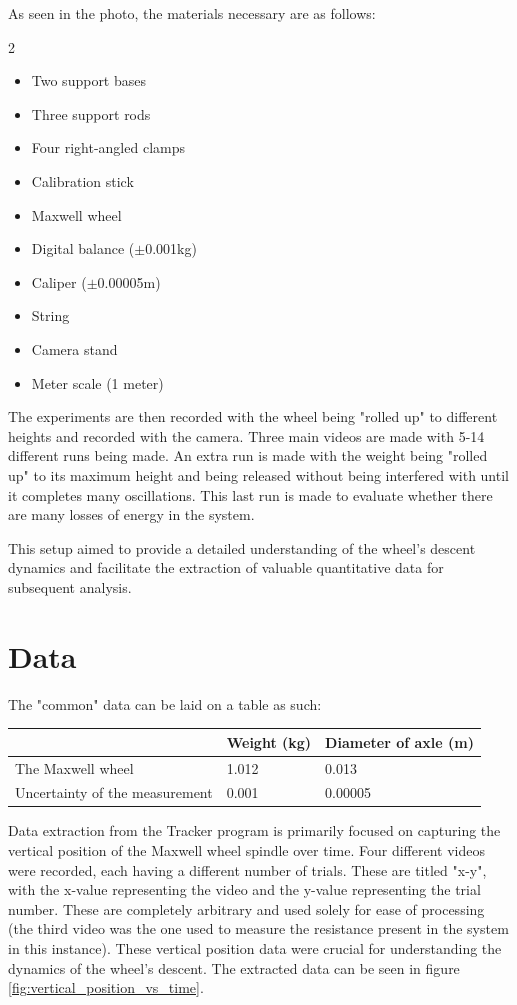 \documentclass{article}
\begin{document}
As seen in the photo, the materials necessary are as follows:

\begin{multicols}{2}
\begin{itemize}
    \item Two support bases
    \item Three support rods
    \item Four right-angled clamps
    \item Calibration stick
    \item Maxwell wheel
    \item Digital balance ($\pm$0.001kg)
    \item Caliper ($\pm$0.00005m)
    \item String
    \item Camera stand
    \item Meter scale (1 meter)
\end{itemize}
\end{multicols}

The experiments are then recorded with the wheel being "rolled up" to different heights and recorded with the camera. Three main videos are made with 5-14 different runs being made. An extra run is made with the weight being "rolled up" to its maximum height and being released without being interfered with until it completes many oscillations. This last run is made to evaluate whether there are many losses of energy in the system.

This setup aimed to provide a detailed understanding of the wheel's descent dynamics and facilitate the extraction of valuable quantitative data for subsequent analysis.

\section*{Data}
The "common" data can be laid on a table as such:
\begin{table}[H]
    \centering
    \begin{tabular}{|l|l|l|}
    \hline
        ~ & Weight (kg) & Diameter of axle (m) \\ \hline
        The Maxwell wheel & 1.012 & 0.013 \\ \hline
        Uncertainty of the measurement & 0.001 & 0.00005 \\ \hline
    \end{tabular}
\end{table}
Data extraction from the Tracker program is primarily focused on capturing the vertical position of the Maxwell wheel spindle over time. Four different videos were recorded, each having a different number of trials. These are titled "x-y", with the x-value representing the video and the y-value representing the trial number. These are completely arbitrary and used solely for ease of processing (the third video was the one used to measure the resistance present in the system in this instance). These vertical position data were crucial for understanding the dynamics of the wheel's descent. The extracted data can be seen in figure \ref{fig:vertical_position_vs_time}.
\end{document}
